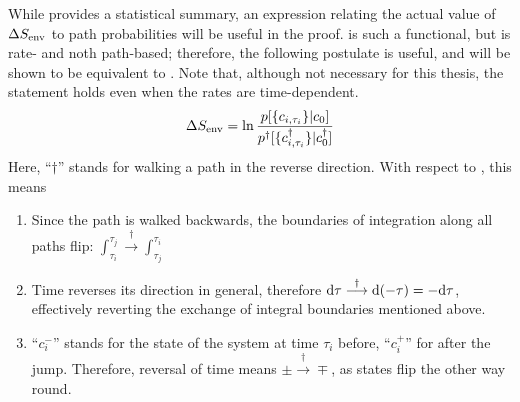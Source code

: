 While  provides a statistical summary, an expression relating the actual value of \(\Delta S_\text{env}\) to path probabilities will be useful in the proof.  is such a functional, but is rate- and noth path-based; therefore, the following postulate is useful, and will be shown to be equivalent to . Note that, although not necessary for this thesis, the statement holds even when the rates are time-dependent.
%
\begin{equation}
	\label{eqn:SEnv path functional}
	\Delta S_\text{env}
	= \ln\frac{p[\{c_{i,\tau_i}\}|c_0]}{p^\dagger[\{c^\dagger_{i,\tau_i}\}|c^\dagger_0]}
\end{equation}
%
Here, ``\(\dagger\)'' stands for walking a path in the reverse direction. With respect to , this means
%
\begin{enumerate}
	\item Since the path is walked backwards, the boundaries of integration along all paths flip: \(\int_{\tau_i}^{\tau_j} \overset\dagger\longrightarrow \int_{\tau_j}^{\tau_i}\)
	\item Time reverses its direction in general, therefore \(\mathrm{d}\tau \overset\dagger\longrightarrow \mathrm{d}(-\tau) = -\mathrm{d}\tau\), effectively reverting the exchange of integral boundaries mentioned above.
	\item ``\(c_i^-\)'' stands for the state of the system at time \(\tau_i\) before, ``\(c_i^+\)'' for after the jump. Therefore, reversal of time means \(\pm\overset\dagger\longrightarrow\mp\), as states flip the other way round.
\end{enumerate}

